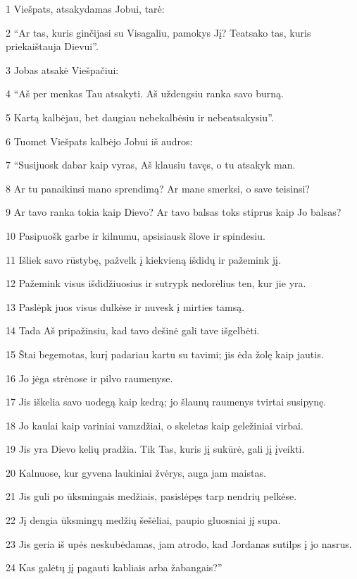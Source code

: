 \par 1 Viešpats, atsakydamas Jobui, tarė: 
\par 2 “Ar tas, kuris ginčijasi su Visagaliu, pamokys Jį? Teatsako tas, kuris priekaištauja Dievui”. 
\par 3 Jobas atsakė Viešpačiui: 
\par 4 “Aš per menkas Tau atsakyti. Aš uždengsiu ranka savo burną. 
\par 5 Kartą kalbėjau, bet daugiau nebekalbėsiu ir nebeatsakysiu”. 
\par 6 Tuomet Viešpats kalbėjo Jobui iš audros: 
\par 7 “Susijuosk dabar kaip vyras, Aš klausiu tavęs, o tu atsakyk man. 
\par 8 Ar tu panaikinsi mano sprendimą? Ar mane smerksi, o save teisinsi? 
\par 9 Ar tavo ranka tokia kaip Dievo? Ar tavo balsas toks stiprus kaip Jo balsas? 
\par 10 Pasipuošk garbe ir kilnumu, apsisiausk šlove ir spindesiu. 
\par 11 Išliek savo rūstybę, pažvelk į kiekvieną išdidų ir pažemink jį. 
\par 12 Pažemink visus išdidžiuosius ir sutrypk nedorėlius ten, kur jie yra. 
\par 13 Paslėpk juos visus dulkėse ir nuvesk į mirties tamsą. 
\par 14 Tada Aš pripažinsiu, kad tavo dešinė gali tave išgelbėti. 
\par 15 Štai begemotas, kurį padariau kartu su tavimi; jis ėda žolę kaip jautis. 
\par 16 Jo jėga strėnose ir pilvo raumenyse. 
\par 17 Jis iškelia savo uodegą kaip kedrą; jo šlaunų raumenys tvirtai susipynę. 
\par 18 Jo kaulai kaip variniai vamzdžiai, o skeletas kaip geležiniai virbai. 
\par 19 Jis yra Dievo kelių pradžia. Tik Tas, kuris jį sukūrė, gali jį įveikti. 
\par 20 Kalnuose, kur gyvena laukiniai žvėrys, auga jam maistas. 
\par 21 Jis guli po ūksmingais medžiais, pasislėpęs tarp nendrių pelkėse. 
\par 22 Jį dengia ūksmingų medžių šešėliai, paupio gluosniai jį supa. 
\par 23 Jis geria iš upės neskubėdamas, jam atrodo, kad Jordanas sutilps į jo nasrus. 
\par 24 Kas galėtų jį pagauti kabliais arba žabangais?”



